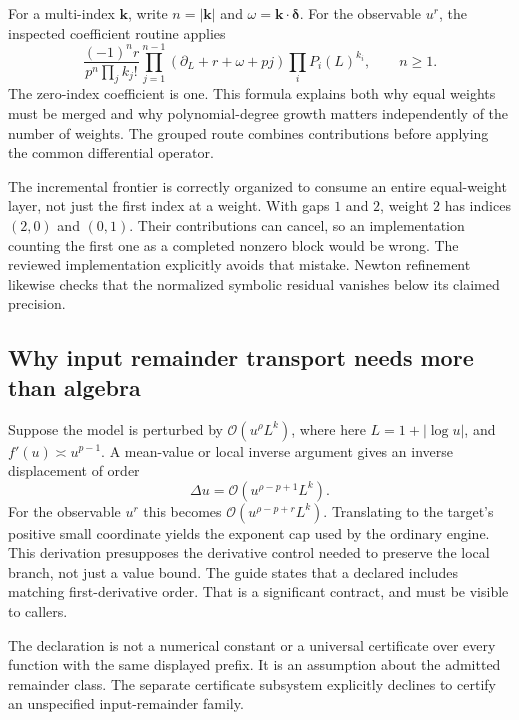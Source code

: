 \documentclass[11pt,letterpaper]{article}
\newcommand{\code}[1]{\texttt{\detokenize{#1}}}
\newcommand{\OO}{\mathcal{O}}
\begin{document}
For a multi-index $\mathbf{k}$, write $n=|\mathbf{k}|$ and $\omega=\mathbf{k}\cdot\boldsymbol\delta$. For the observable $u^r$, the inspected coefficient routine applies
\begin{equation}\label{eq:euler}
 \frac{(-1)^n r}{p^n\prod_j k_j!}
 \prod_{j=1}^{n-1}\left(\partial_L+r+\omega+pj\right)
 \prod_iP_i(L)^{k_i},\qquad n\ge1.
\end{equation}
The zero-index coefficient is one. This formula explains both why equal weights must be merged and why polynomial-degree growth matters independently of the number of weights. The grouped route combines contributions before applying the common differential operator.\cite{incremental}

The incremental frontier is correctly organized to consume an entire equal-weight layer, not just the first index at a weight. With gaps $1$ and $2$, weight $2$ has indices $(2,0)$ and $(0,1)$. Their contributions can cancel, so an implementation counting the first one as a completed nonzero block would be wrong. The reviewed implementation explicitly avoids that mistake. Newton refinement likewise checks that the normalized symbolic residual vanishes below its claimed precision.\cite{incremental}

\subsection{Why input remainder transport needs more than algebra}
Suppose the model is perturbed by $\OO(u^\rho L^k)$, where here $L=1+|\log u|$, and $f'(u)\asymp u^{p-1}$. A mean-value or local inverse argument gives an inverse displacement of order
\begin{equation}
 \Delta u=\OO(u^{\rho-p+1}L^k).
\end{equation}
For the observable $u^r$ this becomes $\OO(u^{\rho-p+r}L^k)$. Translating to the target's positive small coordinate yields the exponent cap used by the ordinary engine. This derivation presupposes the derivative control needed to preserve the local branch, not just a value bound. The guide states that a declared \code{"InputRemainder" -> {rho,k}} includes matching first-derivative order. That is a significant contract, and must be visible to callers.\cite{core,guide}

The declaration is not a numerical constant or a universal certificate over every function with the same displayed prefix. It is an assumption about the admitted remainder class. The separate certificate subsystem explicitly declines to certify an unspecified input-remainder family.\cite{certificates}
\end{document}
